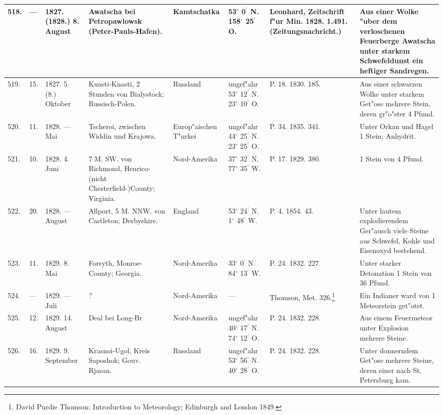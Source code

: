 \documentclass[a4paper, 8pt, oneside, polutonikogreek, german]{article}
\begin{document}
\begin{center}
\begin{longtable}{| p{4mm} | p{2mm} | p{15mm} | p{25mm} | p{16mm} | p{12mm} | p{13mm} | p{20mm} |}
        518. & --- & 1827. (1828.) 8. August & Awatscha bei Petropawlowsk (Peter-Pauls-Hafen). & Kamtschatka & 53$^\circ$ 0$^\prime$ N. 158$^\circ$ 25$^\prime$ O. & Leonhard, Zeitschrift f"ur Min. 1828. 1.491. (Zeitungsnachricht.) & Aus einer Wolke "uber dem verloschenen Feuerberge Awatscha unter starkem Schwefeldunst ein heftiger Sandregen. \\ \hline
        519. & 15. & 1827. 5. (8.) Oktober & Kuasti-Knasti, 2 Stunden von Bialystock; Russisch-Polen. & Russland & ungef"ahr 53$^\circ$ 12$^\prime$ N. 23$^\circ$ 10$^\prime$ O. & P. 18. 1830. 185. & Aus einer schwarzen Wolke unter starkem Get"ose mehrere Stein, deren gr"o"ster 4 Pfund. \\ \hline
        520. & 11. & 1828. --- Mai & Tscheroi, zwischen Widdin und Krajowa. & Europ"aischen T"urkei & ungef"ahr 44$^\circ$ 25$^\prime$ N. 23$^\circ$ 25$^\prime$ O. & P. 34. 1835. 341. & Unter Orkan und Hagel 1 Stein; Anhydrit. \\ \hline
        521. & 10. & 1828. 4. Juni & 7 M. SW. von Richmond, Henrico-(nicht Chesterfield-)County; Virginia. & Nord-Amerika & 37$^\circ$ 32$^\prime$ N. 77$^\circ$ 35$^\prime$ W. & P. 17. 1829. 380. & 1 Stein von 4 Pfund. \\ \hline
        522. & 20. & 1828. --- August & Allport, 5 M. NNW. von Castleton; Derbyshire. & England & 53$^\circ$ 24$^\prime$ N. 1$^\circ$ 48$^\prime$ W. & P. 4. 1854. 43. & Unter lautem explodierendem Ger"ausch viele Steine aus Schwefel, Kohle und Eisenoxyd bestehend. \\ \hline
        523. & 11. & 1829. 8. Mai & Forsyth, Monroe-County; Georgia. & Nord-Amerika & 33$^\circ$ 0$^\prime$ N. 84$^\circ$ 13$^\prime$ W. & P. 24. 1832. 227. & Unter starker Detonation 1 Stein von 36 Pfund. \\ \hline
        524. & --- & 1829. --- Juli & ? & Nord-Amerika & --- & Thomson, Met. 326.\footnote{David Purdie Thomson: Introduction to Meteorology; Edinburgh and London 1849.} & Ein Indianer ward von 1 Meteorstein get"otet. \\ \hline
        525. & 12. & 1829. 14. August & Deal bei Long-Br & Nord-Amerika & ungef"ahr 40$^\circ$ 17$^\prime$ N. 74$^\circ$ 12$^\prime$ O. & P. 24. 1832. 228. & Aus einem Feuermeteor unter Explosion mehrere Steine. \\ \hline
        526. & 16. & 1829. 9. September & Krasnoi-Ugol, Kreis Saposhok; Gouv. Rjasan. & Russland & ungef"ahr 53$^\circ$ 56$^\prime$ N. 40$^\circ$ 28$^\prime$ O. & P. 24. 1832. 228. & Unter donnerndem Get"ose mehrere Steine, deren einer nach St. Petersburg kam. \\ \hline

\end{longtable}
\end{center}
\end{document}
